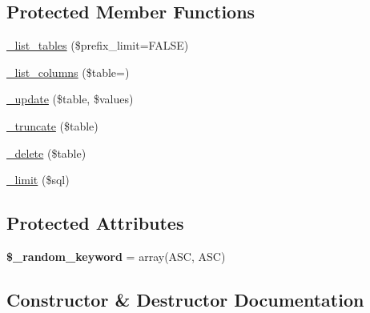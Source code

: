 \subsection*{Protected Member Functions}
\begin{DoxyCompactItemize}
\item 
\mbox{\hyperlink{class_c_i___d_b__pdo__informix__driver_aedcf09674858fcecc7131e654af0d430}{\+\_\+list\+\_\+tables}} (\$prefix\+\_\+limit=F\+A\+L\+SE)
\item 
\mbox{\hyperlink{class_c_i___d_b__pdo__informix__driver_ad3ac9c3f29e912d73c52d0619f118945}{\+\_\+list\+\_\+columns}} (\$table=\textquotesingle{}\textquotesingle{})
\item 
\mbox{\hyperlink{class_c_i___d_b__pdo__informix__driver_ad8160c560c949c57c8a1db761fb75bb0}{\+\_\+update}} (\$table, \$values)
\item 
\mbox{\hyperlink{class_c_i___d_b__pdo__informix__driver_a0412f7b07e3d5df616aea1533cea597b}{\+\_\+truncate}} (\$table)
\item 
\mbox{\hyperlink{class_c_i___d_b__pdo__informix__driver_abc5569e1a497b1f056cc01aa216780b5}{\+\_\+delete}} (\$table)
\item 
\mbox{\hyperlink{class_c_i___d_b__pdo__informix__driver_aa84b07a0a8e72cd95c514f6cde1f96d3}{\+\_\+limit}} (\$sql)
\end{DoxyCompactItemize}
\subsection*{Protected Attributes}
\begin{DoxyCompactItemize}
\item 
\mbox{\label{class_c_i___d_b__pdo__informix__driver_aa087dd2f1c0e2c9cb4888ece51c192aa}} 
{\bfseries \$\+\_\+random\+\_\+keyword} = array(\textquotesingle{}A\+SC\textquotesingle{}, \textquotesingle{}A\+SC\textquotesingle{})
\end{DoxyCompactItemize}


\subsection{Constructor \& Destructor Documentation}
\mbox{\label{class_c_i___d_b__pdo__informix__driver_a47f83ea300c50f6d8f9476409c374a2d}} 
